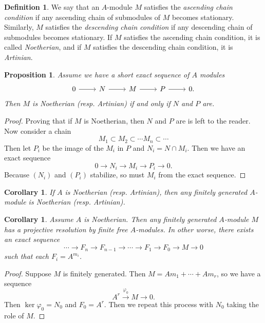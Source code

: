 \documentclass[leqno, openany]{memoir}
\newtheorem{cor}[thm]{Corollary}
\newtheorem{prop}[thm]{Proposition}
\theoremstyle{definition}
\newtheorem{defn}[thm]{Definition}
\theoremstyle{remark}
\theoremstyle{plain}
\theoremstyle{definition}
\theoremstyle{remark}
\begin{document}
\begin{defn} We say that an $A$-module $M$ satisfies the \textit{ascending
    chain condition} if any ascending chain of submodules of $M$ becomes
    stationary. Similarly, $M$ satisfies the \textit{descending chain
    condition} if any descending chain of submodules becomes stationary. If $M$
    satisfies the ascending chain condition, it is called \textit{Noetherian},
    and if $M$ satisfies the descending chain condition, it is
    \textit{Artinian}.  \end{defn}

\begin{prop} Assume we have a short exact sequence of $A$ modules
    \begin{equation} \begin{tikzcd} 0 \arrow{r} & N \arrow{r} & M \arrow{r} & P
    \arrow{r} & 0.  \end{tikzcd} \end{equation} Then $M$ is Noetherian (resp.
    Artinian) if and only if $N$ and $P$ are.  \end{prop}

\begin{proof} Proving that if $M$ is Noetherian, then $N$ and $P$ are is left
    to the reader. Now consider a chain \[ M_1 \subset M_2 \subset \cdots M_n
    \subset \cdots \] Then let $P_i$ be the image of the $M_i$ in $P$ and $N_i
    = N \cap M_i$. Then we have an exact sequence \[ 0 \to N_i \to M_i \to P_i
    \to 0. \] Because $(N_i)$ and $(P_i)$ stabilize, so must $M_i$ from the
exact sequence.  \end{proof}

\begin{cor} If $A$ is Noetherian (resp. Artinian), then any finitely generated
$A$-module is Noetherian (resp. Artinian).  \end{cor}

\begin{cor} Assume $A$ is Noetherian. Then any finitely generated $A$-module
    $M$ has a projective resolution by finite free $A$-modules. In other worse,
    there exists an exact sequence \[ \cdots \to F_n \to F_{n-1} \to \cdots \to
    F_1 \to F_0 \to M \to 0 \] such that each $F_i = A^{m_i}$.  \end{cor}

\begin{proof} Suppose $M$ is finitely generated. Then $M = A m_1 + \cdots + A
    m_r$, so we have a sequence \[ A^r \xrightarrow{\varphi_0} M \to 0. \] Then
    $\ker \varphi_0 = N_0$ and $F_0 = A^r$. Then we repeat this process with
    $N_0$ taking the role of $M$.  \end{proof}
\end{document}
